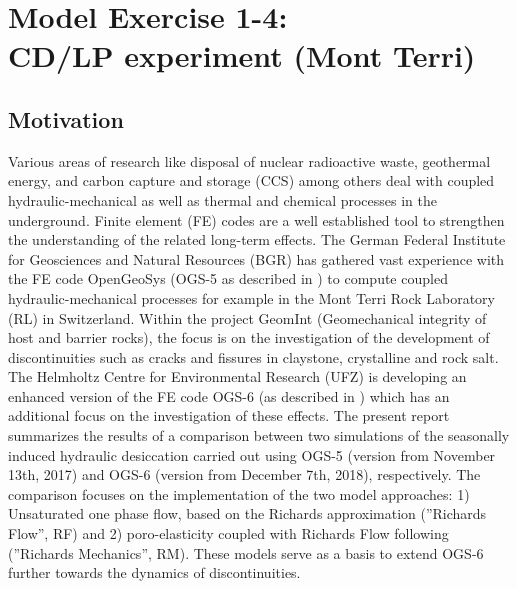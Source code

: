 \section[MEX 1-4: CD/LP experiment (Mont Terri)]{Model Exercise 1-4:\\CD/LP experiment (Mont Terri)}
\label{sec:mex10}
\subsection{Motivation}
Various areas of research like disposal of nuclear radioactive waste, geothermal energy, and carbon capture and storage (CCS) among others deal with coupled hydraulic-mechanical as well as thermal and chemical processes in the underground. Finite element (FE) codes are a well established tool to strengthen the understanding of the related long-term effects. The German Federal Institute for Geosciences and Natural Resources (BGR) has gathered vast experience with the FE code OpenGeoSys (OGS-5 as described in \cite{kolditz2012})  to compute coupled  hydraulic-mechanical processes for example in the  Mont Terri Rock Laboratory (RL) in Switzerland. Within the project GeomInt (Geomechanical integrity of host and barrier rocks), the focus is on the investigation of the development of discontinuities such as cracks and fissures in claystone, crystalline and rock salt. The Helmholtz Centre for Environmental Research (UFZ) is developing an enhanced version of the FE code OGS-6 (as described in \cite{Naumov:2018}) which has an additional focus on the investigation of these effects.   The present report summarizes the results of a comparison between two simulations of the seasonally induced hydraulic desiccation carried out using OGS-5 (version from November 13th, 2017) and OGS-6 (version from December 7th, 2018), respectively. The comparison focuses on the implementation of the two model approaches: 1) Unsaturated one phase flow, based on the Richards approximation \cite{richards1931} (”Richards Flow”, RF) and 2) poro-elasticity coupled with Richards Flow following \cite{biot1941} (”Richards Mechanics”, RM). These models serve as a basis to extend OGS-6 further towards the dynamics of discontinuities.

